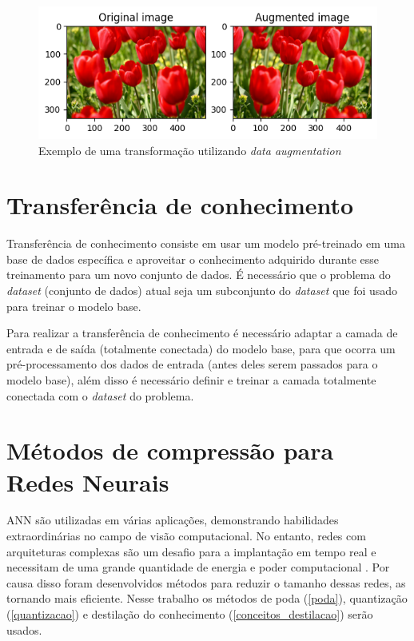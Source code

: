 \begin{figure}[htb]
	\caption {\label{cap_conceitos_exemplo_da}Exemplo de uma transformação utilizando \textit{data augmentation}}
	\begin{center}
		\includegraphics[scale=1]{Imagens/exemplo_da}
	\end{center}
\end{figure}

\section{Transferência de conhecimento}\label{cap_conceitos_transferencia}
Transferência de conhecimento consiste em usar um modelo pré-treinado em uma base de dados específica e aproveitar
o conhecimento adquirido durante esse treinamento para um novo conjunto de dados.
É necessário que o problema do \textit{dataset} (conjunto de dados) atual seja um subconjunto do \textit{dataset}
que foi usado para treinar o modelo base.

Para realizar a transferência de conhecimento é necessário adaptar a camada de entrada e de saída
(totalmente conectada) do modelo base, para que ocorra um pré-processamento dos dados de entrada
(antes deles serem passados para o modelo base), além disso é necessário definir e treinar a camada totalmente
conectada com o \textit{dataset} do problema.

\section{Métodos de compressão para Redes Neurais}\label{cap_conceitos_compressao_redes}
ANN são utilizadas em várias aplicações, demonstrando habilidades extraordinárias no campo de visão computacional.
No entanto, redes com arquiteturas complexas são um desafio para a implantação em tempo real e necessitam de uma
grande quantidade de energia e poder computacional \cite{LIANG2021370}.
Por causa disso foram desenvolvidos métodos para reduzir o tamanho dessas redes, as tornando mais eficiente.
Nesse trabalho os métodos de poda (\ref{poda}), quantização (\ref{quantizacao}) e destilação do conhecimento
(\ref{conceitos_destilacao}) serão usados.

